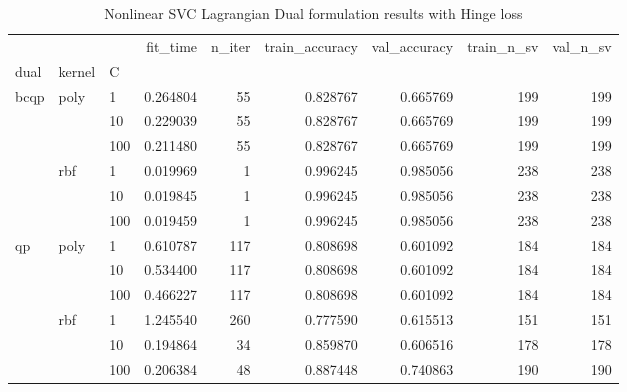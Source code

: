 \begin{table}[h!]
\centering
\caption{Nonlinear SVC Lagrangian Dual formulation results with Hinge loss}
\label{nonlinear_lagrangian_dual_svc_cv_results}
\begin{tabular}{lllrrrrrr}
\toprule
   &     &     &  fit\_time &  n\_iter &  train\_accuracy &  val\_accuracy &  train\_n\_sv &  val\_n\_sv \\
dual & kernel & C &           &         &                 &               &             &           \\
\midrule
bcqp & poly & 1   &  0.264804 &      55 &        0.828767 &      0.665769 &         199 &       199 \\
   &     & 10  &  0.229039 &      55 &        0.828767 &      0.665769 &         199 &       199 \\
   &     & 100 &  0.211480 &      55 &        0.828767 &      0.665769 &         199 &       199 \\
   & rbf & 1   &  0.019969 &       1 &        0.996245 &      0.985056 &         238 &       238 \\
   &     & 10  &  0.019845 &       1 &        0.996245 &      0.985056 &         238 &       238 \\
   &     & 100 &  0.019459 &       1 &        0.996245 &      0.985056 &         238 &       238 \\
qp & poly & 1   &  0.610787 &     117 &        0.808698 &      0.601092 &         184 &       184 \\
   &     & 10  &  0.534400 &     117 &        0.808698 &      0.601092 &         184 &       184 \\
   &     & 100 &  0.466227 &     117 &        0.808698 &      0.601092 &         184 &       184 \\
   & rbf & 1   &  1.245540 &     260 &        0.777590 &      0.615513 &         151 &       151 \\
   &     & 10  &  0.194864 &      34 &        0.859870 &      0.606516 &         178 &       178 \\
   &     & 100 &  0.206384 &      48 &        0.887448 &      0.740863 &         190 &       190 \\
\bottomrule
\end{tabular}
\end{table}

